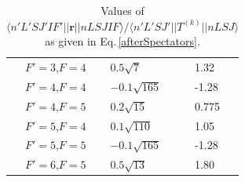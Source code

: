 \begin{table}[h!]
\centering
\begin{tabular}{|c|l|l|}
\hline
$F'=3$,$F=4$&$0.5 \sqrt{7}$&1.32\\ 
$F'=4$,$F=4$&$- 0.1 \sqrt{165}$&-1.28\\ 
$F'=4$,$F=5$&$0.2 \sqrt{15}$&0.775\\ 
$F'=5$,$F=4$&$0.1 \sqrt{110}$&1.05\\ 
$F'=5$,$F=5$&$- 0.1 \sqrt{165}$&-1.28\\ 
$F'=6$,$F=5$&$0.5 \sqrt{13}$&1.80\\ 
\hline
\end{tabular}
\caption{Values of $\langle n' L' S J' I F' ||\mathbf{r}||n L S J I F\rangle / \langle n'L' S J'||T^{(k)}|| n L S J\rangle$ as given in Eq.\,\ref{afterSpectators}.
\label{coefficient_calculated}}
\end{table}


